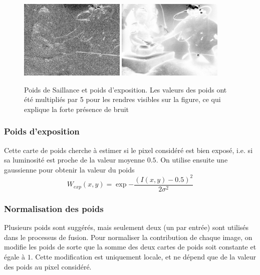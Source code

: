 \documentclass[twoside]{article}
\begin{document}
\begin{figure}[]
  \centering
  \includegraphics[width=0.45\textwidth]{Support/saliency.png}
  \includegraphics[width=0.45\textwidth]{Support/exposedness.png}
  \caption{Poids de Saillance et poids d'exposition. Les valeurs des poids ont été multipliés par 5 pour les rendres visibles sur la figure, ce qui explique la forte présence de bruit}
\end{figure}

\subsubsection{Poids d'exposition}
Cette carte de poids cherche à estimer si le pixel considéré est bien exposé, i.e. si sa luminosité est proche de la valeur moyenne $0.5$. On utilise ensuite une gaussienne pour obtenir la valeur du poids $$W_{exp}(x,y) = \exp{-\frac{(I(x,y) - 0.5)^2}{2\sigma^2}}$$

 \subsubsection{Normalisation des poids}
Plusieurs poids sont suggérés, mais seulement deux (un par entrée) sont utilisés dans le processus de fusion. Pour normaliser la contribution de chaque image, on modifie les poids de sorte que la somme des deux cartes de poids soit constante et égale à $1$. Cette modification est uniquement locale, et ne dépend que de la valeur des poids au pixel considéré.
\end{document}
